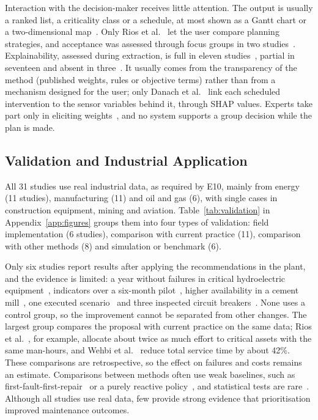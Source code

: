 \label{sec:sys-interaction}
Interaction with the decision-maker receives little attention. The output is usually a ranked list, a criticality class or a schedule, at most shown as a Gantt chart or a two-dimensional map~\cite{geng2022,gao2024,hedayatnia2025}. Only Rios et al.~\cite{rios2024} let the user compare planning strategies, and acceptance was assessed through focus groups in two studies~\cite{gopalakrishnan2022,rios2024}. Explainability, assessed during extraction, is full in eleven studies~\cite{darko2026,panwar2021,bahadir2026,gopalakrishnan2022,rios2025,schulze2022,danach2026,bahrami2021,hall2021,shaulagara2023,zhou2024}, partial in seventeen and absent in three~\cite{woller2023,li2027,bi2022}. It usually comes from the transparency of the method (published weights, rules or objective terms) rather than from a mechanism designed for the user; only Danach et al.~\cite{danach2026} link each scheduled intervention to the sensor variables behind it, through SHAP values. Experts take part only in eliciting weights~\cite{panwar2021,rios2025,qiu2026,moradi2024}, and no system supports a group decision while the plan is made.

\subsection{Validation and Industrial Application}
\label{sec:sys-validation}

All 31 studies use real industrial data, as required by E10, mainly from energy (11 studies), manufacturing (11) and oil and gas (6), with single cases in construction equipment, mining and aviation. Table~\ref{tab:validation} in Appendix~\ref{app:figures} groups them into four types of validation: field implementation (6 studies), comparison with current practice (11), comparison with other methods (8) and simulation or benchmark (6).

Only six studies report results after applying the recommendations in the plant, and the evidence is limited: a year without failures in critical hydroelectric equipment~\cite{ozcan2021,bulut2021}, indicators over a six-month pilot~\cite{delgado2026}, higher availability in a cement mill~\cite{hall2021}, one executed scenario~\cite{wittbrodt2026} and three inspected circuit breakers~\cite{hedayatnia2025}. None uses a control group, so the improvement cannot be separated from other changes. The largest group compares the proposal with current practice on the same data; Rios et al.~\cite{rios2025}, for example, allocate about twice as much effort to critical assets with the same man-hours, and Wehbi et al.~\cite{wehbi2026} reduce total service time by about 42\%. These comparisons are retrospective, so the effect on failures and costs remains an estimate. Comparisons between methods often use weak baselines, such as first-fault-first-repair~\cite{geng2022} or a purely reactive policy~\cite{danach2026}, and statistical tests are rare~\cite{tang2026,gopalakrishnan2022,li2027}. Although all studies use real data, few provide strong evidence that prioritisation improved maintenance outcomes.